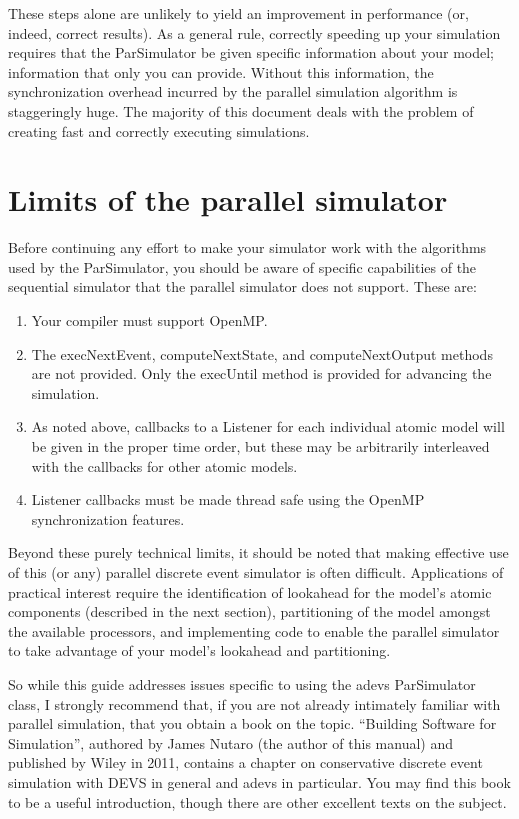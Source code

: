 These steps alone are unlikely to yield an improvement in performance (or, indeed, correct results). As a general rule, correctly speeding up your simulation requires that the ParSimulator be given specific information about your model; information that only you can provide. Without this information, the synchronization overhead incurred by the parallel simulation algorithm is staggeringly huge. The majority of this document deals with the problem of creating fast and correctly executing simulations.
 
\section{Limits of the parallel simulator}
Before continuing any effort to make your simulator work with the algorithms used by the ParSimulator, you should be aware of specific capabilities of the sequential simulator that the parallel simulator does not support. These are:
\begin{enumerate}
\item Your compiler must support OpenMP.
\item The execNextEvent, computeNextState, and computeNextOutput methods are not provided. Only the execUntil method is provided for advancing the simulation.
\item As noted above, callbacks to a Listener for each individual atomic model will be given in the proper time order, but these may be arbitrarily interleaved with the callbacks for other atomic models.
\item Listener callbacks must be made thread safe using the OpenMP synchronization features.
\end{enumerate}

Beyond these purely technical limits, it should be noted that making effective use of this (or any) parallel discrete event simulator is often difficult. Applications of practical interest require the identification of lookahead for the model's atomic components (described in the next section), partitioning of the model amongst the available processors, and implementing code to enable the parallel simulator to take advantage of your model's lookahead and partitioning.

So while this guide addresses issues specific to using the adevs ParSimulator class, I strongly recommend that, if you are not already intimately familiar with parallel simulation, that you obtain a book on the topic. ``Building Software for Simulation'', authored by James Nutaro (the author of this manual) and published by Wiley in 2011, contains a chapter on conservative discrete event simulation with DEVS in general and adevs in particular. You may find this book to be a useful introduction, though there are other excellent texts on the subject.

